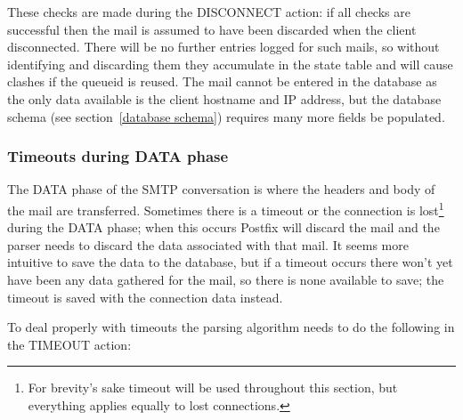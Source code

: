 \documentclass[a4paper,12pt,draft]{article}
\begin{document}
These checks are made during the DISCONNECT action: if all checks are
successful then the mail is assumed to have been discarded when the client
disconnected.  There will be no further entries logged for such mails, so
without identifying and discarding them they accumulate in the state table
and will cause clashes if the queueid is reused.  The mail cannot be
entered in the database as the only data available is the client hostname
and IP address, but the database schema (see section~\ref{database schema})
requires many more fields be populated.

\subsubsection{Timeouts during DATA phase}

\label{timeouts-during-data-phase}

The DATA phase of the SMTP conversation is where the headers and body of the
mail are transferred.  Sometimes there is a timeout or the connection is
lost\footnote{For brevity's sake timeout will be used throughout this
section, but everything applies equally to lost connections.} during the
DATA phase; when this occurs Postfix will discard the mail and the parser
needs to discard the data associated with that mail.  It seems more
intuitive to save the data to the database, but if a timeout occurs there
won't yet have been any data gathered for the mail, so there is none
available to save; the timeout is saved with the connection data instead.

To deal properly with timeouts the parsing algorithm needs to do the
following in the TIMEOUT action:
\end{document}
